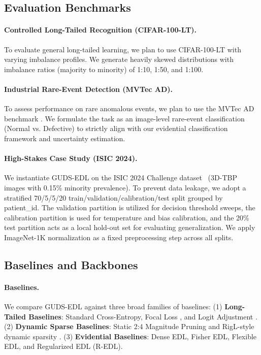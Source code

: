 \documentclass[letterpaper]{article} %
\begin{document}
\subsection{Evaluation Benchmarks}
\paragraph{Controlled Long-Tailed Recognition (CIFAR-100-LT).} To evaluate general long-tailed learning, we plan to use CIFAR-100-LT with varying imbalance profiles. We generate heavily skewed distributions with imbalance ratios (majority to minority) of 1:10, 1:50, and 1:100.

\paragraph{Industrial Rare-Event Detection (MVTec AD).} To assess performance on rare anomalous events, we plan to use the MVTec AD benchmark \cite{bergmann2019mvtec}. We formulate the task as an image-level rare-event classification (Normal vs. Defective) to strictly align with our evidential classification framework and uncertainty estimation.

\paragraph{High-Stakes Case Study (ISIC 2024).} We instantiate GUDS-EDL on the ISIC 2024 Challenge dataset~\cite{isic2024} (3D-TBP images with 0.15\% minority prevalence). To prevent data leakage, we adopt a stratified 70/5/5/20 train/validation/calibration/test split grouped by patient\_id. The validation partition is utilized for decision threshold sweeps, the calibration partition is used for temperature and bias calibration, and the 20\% test partition acts as a local hold-out set for evaluating generalization. We apply ImageNet-1K normalization as a fixed preprocessing step across all splits.

\subsection{Baselines and Backbones}
\paragraph{Baselines.} We compare GUDS-EDL against three broad families of baselines: 
(1) \textbf{Long-Tailed Baselines}: Standard Cross-Entropy, Focal Loss \cite{lin2017focal}, and Logit Adjustment \cite{menon2021long}.
(2) \textbf{Dynamic Sparse Baselines}: Static 2:4 Magnitude Pruning and RigL-style dynamic sparsity \cite{evci2020rigging}.
(3) \textbf{Evidential Baselines}: Dense EDL, Fisher EDL, Flexible EDL, and Regularized EDL (R-EDL).
\end{document}
